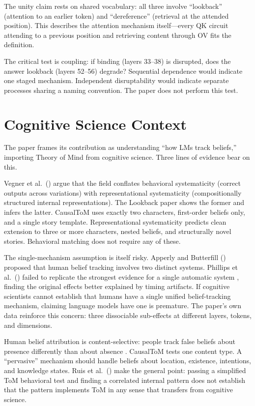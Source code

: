 \documentclass{article}
\begin{document}
The unity claim rests on shared vocabulary: all three involve ``lookback'' (attention to an earlier token) and ``dereference'' (retrieval at the attended position). This describes the attention mechanism itself---every QK circuit attending to a previous position and retrieving content through OV fits the definition.

The critical test is coupling: if binding (layers 33--38) is disrupted, does the answer lookback (layers 52--56) degrade? Sequential dependence would indicate one staged mechanism. Independent disruptability would indicate separate processes sharing a naming convention. The paper does not perform this test.


\section{Cognitive Science Context}
\label{sec:cogsci}

The paper frames its contribution as understanding ``how LMs track beliefs,'' importing Theory of Mind from cognitive science. Three lines of evidence bear on this.

Vegner et al.\ (\citeyear{vegner2025systematicity}) argue that the field conflates behavioral systematicity (correct outputs across variations) with representational systematicity (compositionally structured internal representations). The Lookback paper shows the former and infers the latter. CausalToM uses exactly two characters, first-order beliefs only, and a single story template. Representational systematicity predicts clean extension to three or more characters, nested beliefs, and structurally novel stories. Behavioral matching does not require any of these.

The single-mechanism assumption is itself risky. Apperly and Butterfill (\citeyear{apperly2009humans}) proposed that human belief tracking involves two distinct systems. Phillips et al.\ (\citeyear{phillips2015second}) failed to replicate the strongest evidence for a single automatic system \citep{kovacs2010social}, finding the original effects better explained by timing artifacts. If cognitive scientists cannot establish that humans have a single unified belief-tracking mechanism, claiming language models have one is premature. The paper's own data reinforce this concern: three dissociable sub-effects at different layers, tokens, and dimensions.

Human belief attribution is content-selective: people track false beliefs about presence differently than about absence \citep{schuwerk2015implicit}. CausalToM tests one content type. A ``pervasive'' mechanism should handle beliefs about location, existence, intentions, and knowledge states. Ruis et al.\ (\citeyear{ruis2025reevaluating}) make the general point: passing a simplified ToM behavioral test and finding a correlated internal pattern does not establish that the pattern implements ToM in any sense that transfers from cognitive science.
\end{document}
